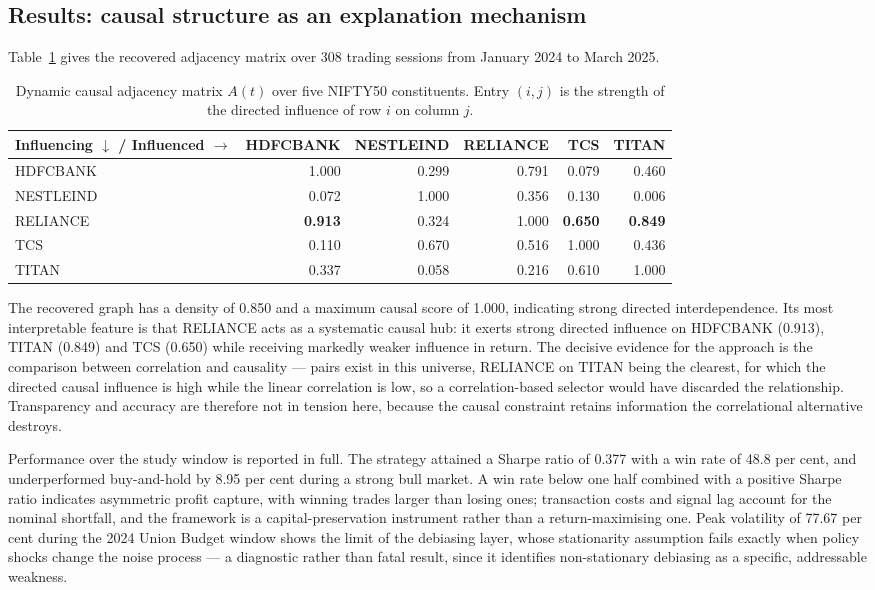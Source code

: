 \subsection{Results: causal structure as an explanation mechanism}

Table~\ref{tab:causal} gives the recovered adjacency matrix over 308 trading sessions from
January 2024 to March 2025.

\begin{table}[!htb]
\centering
\caption[Dynamic causal adjacency matrix]{Dynamic causal adjacency matrix $A(t)$ over five
NIFTY50 constituents. Entry $(i,j)$ is the strength of the directed influence of row $i$ on
column $j$.}
\label{tab:causal}
\tabfont
\begin{tabular}{@{}lrrrrr@{}}
\toprule
\textbf{Influencing $\downarrow$ / Influenced $\rightarrow$} & \textbf{HDFCBANK} &
\textbf{NESTLEIND} & \textbf{RELIANCE} & \textbf{TCS} & \textbf{TITAN} \\
\midrule
HDFCBANK  & 1.000 & 0.299 & 0.791 & 0.079 & 0.460 \\
NESTLEIND & 0.072 & 1.000 & 0.356 & 0.130 & 0.006 \\
RELIANCE  & \textbf{0.913} & 0.324 & 1.000 & \textbf{0.650} & \textbf{0.849} \\
TCS       & 0.110 & 0.670 & 0.516 & 1.000 & 0.436 \\
TITAN     & 0.337 & 0.058 & 0.216 & 0.610 & 1.000 \\
\bottomrule
\end{tabular}
\end{table}

The recovered graph has a density of 0.850 and a maximum causal score of 1.000, indicating
strong directed interdependence. Its most interpretable feature is that RELIANCE acts as a
systematic causal hub: it exerts strong directed influence on HDFCBANK (0.913), TITAN (0.849)
and TCS (0.650) while receiving markedly weaker influence in return. The decisive evidence for
the approach is the comparison between correlation and causality --- pairs exist in this
universe, RELIANCE on TITAN being the clearest, for which the directed causal influence is high
while the linear correlation is low, so a correlation-based selector would have discarded the
relationship. Transparency and accuracy are therefore not in tension here, because the causal
constraint retains information the correlational alternative destroys.

Performance over the study window is reported in full. The strategy attained a Sharpe ratio of
0.377 with a win rate of 48.8 per cent, and underperformed buy-and-hold by 8.95 per cent during
a strong bull market. A win rate below one half combined with a positive Sharpe ratio indicates
asymmetric profit capture, with winning trades larger than losing ones; transaction costs and
signal lag account for the nominal shortfall, and the framework is a capital-preservation
instrument rather than a return-maximising one. Peak volatility of 77.67 per cent during the
2024 Union Budget window shows the limit of the debiasing layer, whose stationarity assumption
fails exactly when policy shocks change the noise process --- a diagnostic rather than fatal
result, since it identifies non-stationary debiasing as a specific, addressable weakness.

